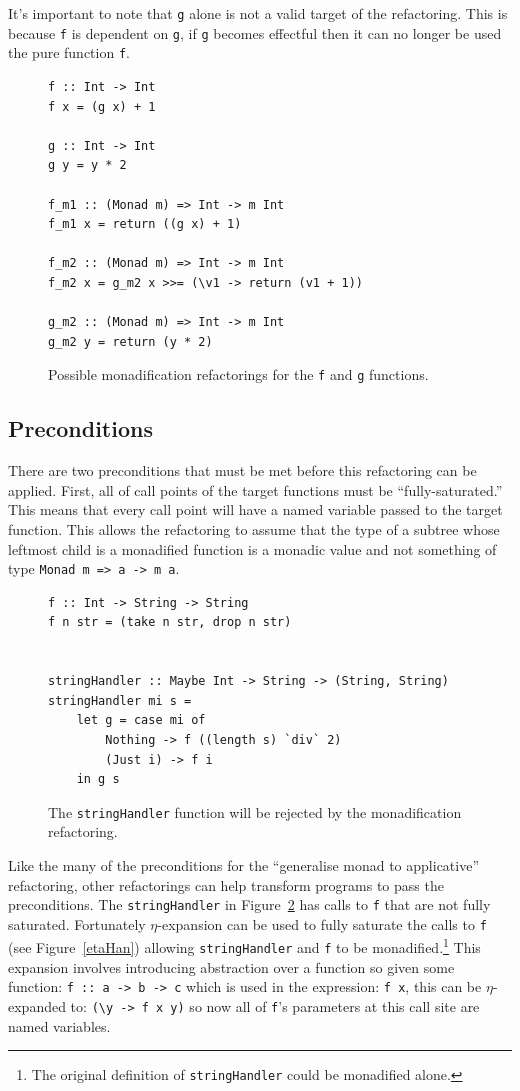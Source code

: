 It's important to note that \texttt{g} alone is not a valid target of the refactoring. This is because \texttt{f} is dependent on \texttt{g}, if \texttt{g} becomes effectful then it can no longer be used the pure function \texttt{f}. 

\begin{figure}[t]
\begin{lstlisting}
f :: Int -> Int
f x = (g x) + 1

g :: Int -> Int
g y = y * 2

f_m1 :: (Monad m) => Int -> m Int
f_m1 x = return ((g x) + 1)

f_m2 :: (Monad m) => Int -> m Int
f_m2 x = g_m2 x >>= (\v1 -> return (v1 + 1))

g_m2 :: (Monad m) => Int -> m Int
g_m2 y = return (y * 2)
\end{lstlisting}
\caption{Possible monadification refactorings for the \texttt{f} and \texttt{g} functions.}
\label{fgMon}
\end{figure} 

\subsection{Preconditions}

There are two preconditions that must be met before this refactoring can be applied. First, all of call points of the target functions must be ``fully-saturated.'' This means that every call point will have a named variable passed to the target function. This allows the refactoring to assume that the type of a subtree whose leftmost child is a monadified function is a monadic value and not something of type \texttt{Monad m => a -> m a}. 

\begin{figure}[t]
\begin{lstlisting}
f :: Int -> String -> String
f n str = (take n str, drop n str)


stringHandler :: Maybe Int -> String -> (String, String)
stringHandler mi s = 
	let g = case mi of
		Nothing -> f ((length s) `div` 2)
		(Just i) -> f i
	in g s
\end{lstlisting}
\caption{The \texttt{stringHandler} function will be rejected by the monadification refactoring.}
\label{strHan}
\end{figure}

Like the many of the preconditions for the ``generalise monad to applicative'' refactoring, other refactorings can help transform programs to pass the preconditions. The \texttt{stringHandler} in Figure~\ref{strHan} has calls to \texttt{f} that are not fully saturated. Fortunately $\eta$-expansion can be used to fully saturate the calls to \texttt{f} (see Figure~\ref{etaHan}) allowing \texttt{stringHandler} and \texttt{f} to be monadified.\footnote{The original definition of \texttt{stringHandler} could be monadified alone.} This expansion involves introducing abstraction over a function so given some function: \texttt{f :: a -> b -> c} which is used in the expression: \texttt{f x}, this can be $\eta$-expanded to: \texttt{(\textbackslash y -> f x y)} so now all of \texttt{f}'s parameters at this call site are named variables. 

